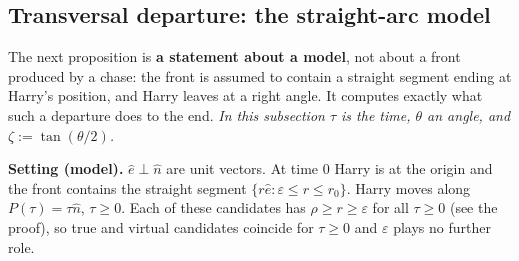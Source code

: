 \subsection{Transversal departure: the straight-arc model}

The next proposition is \textbf{a statement about a model}, not about a front produced by a chase: the front is assumed to contain
a straight segment ending at Harry's position, and Harry leaves at a right angle. It computes exactly what such a departure does to
the end. \emph{In this subsection $\tau$ is the time, $\theta$ an angle, and $\zeta:=\tan(\theta/2)$.}

\medskip\noindent\textbf{Setting (model).} $\hat e\perp\hat n$ are unit vectors. At time $0$ Harry is at the origin and the front
contains the straight segment $\{r\hat e:\varepsilon\le r\le r_0\}$. Harry moves along $P(\tau)=\tau\hat n$, $\tau\ge0$. Each of
these candidates has $\rho\ge r\ge\varepsilon$ for all $\tau\ge0$ (see the proof), so true and virtual candidates coincide for
$\tau\ge0$ and $\varepsilon$ plays no further role.

